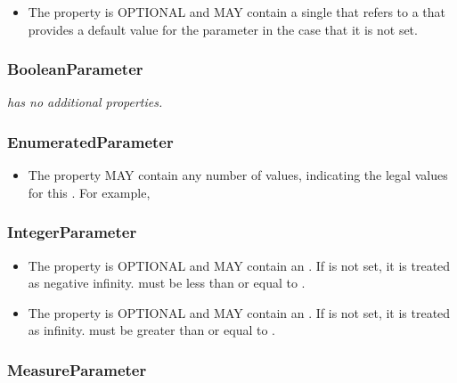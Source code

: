 \begin{itemize}
\item \label{sec:defaultValue}
The  property is OPTIONAL and MAY contain a single  that refers to a  that provides a default value for the parameter in the case that it is not set.
\end{itemize}


\subsubsection{BooleanParameter}
\label{sec:BooleanParameter}

{\em {} has no additional properties.}

\subsubsection{EnumeratedParameter}
\label{sec:EnumeratedParameter}

\begin{itemize}
\item \label{sec:allowedValue}
The  property MAY contain any number of  values, indicating the legal values for this . 
For example, 
\end{itemize}

\subsubsection{IntegerParameter}
\label{sec:IntegerParameter}

\begin{itemize}
\item \label{sec:minValue}
The  property is OPTIONAL and MAY contain an .
If  is not set, it is treated as negative infinity.
 must be less than or equal to .

\item \label{sec:maxValue}
The  property is OPTIONAL and MAY contain an .
If  is not set, it is treated as infinity.
 must be greater than or equal to .
\end{itemize}

\subsubsection{MeasureParameter}
\label{sec:MeasureParameter}

